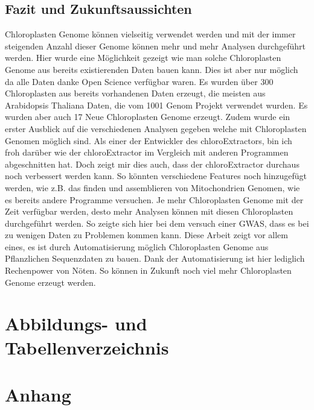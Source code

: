 \documentclass{scrartcl}
\begin{document}
\subsection{Fazit und Zukunftsaussichten}
\label{sec-5-8}
Chloroplasten Genome können vielseitig verwendet werden und mit der immer steigenden Anzahl dieser Genome können mehr und mehr Analysen durchgeführt werden. Hier wurde eine Möglichkeit gezeigt wie man solche Chloroplasten Genome
aus bereits existierenden Daten bauen kann. Dies ist aber nur möglich da alle Daten danke Open Science verfügbar waren. Es wurden über 300 Chloroplasten aus bereits vorhandenen Daten erzeugt, die meisten aus Arabidopsis Thaliana
Daten, die vom 1001 Genom Projekt verwendet wurden. Es wurden aber auch 17 Neue Chloroplasten Genome erzeugt. Zudem wurde ein erster Ausblick auf die verschiedenen Analysen gegeben welche mit Chloroplasten Genomen möglich sind.
Als einer der Entwickler des chloroExtractors, bin ich froh darüber wie der chloroExtractor im Vergleich mit anderen Programmen abgeschnitten hat. Doch zeigt mir dies auch, dass der chloroExtractor durchaus noch verbessert 
werden kann.
So könnten verschiedene Features noch hinzugefügt werden, wie z.B. das finden und assemblieren von Mitochondrien Genomen, wie es bereits andere Programme versuchen. Je mehr Chloroplasten Genome mit der Zeit verfügbar werden, desto 
mehr Analysen können mit diesen Chloroplasten durchgeführt werden. So zeigte sich hier bei dem versuch einer GWAS, dass es bei zu wenigen Daten zu Problemen kommen kann. 
Diese Arbeit zeigt vor allem eines, es ist durch Automatisierung möglich Chloroplasten Genome aus Pflanzlichen Sequenzdaten zu bauen. Dank der Automatisierung ist hier lediglich Rechenpower von Nöten. So können in Zukunft
noch viel mehr Chloroplasten Genome erzeugt werden.
\section{Abbildungs- und Tabellenverzeichnis}
\label{sec-6}
\listoffigures

\listoftables
\clearpage
\section{Anhang}
\label{sec-7}
\end{document}
